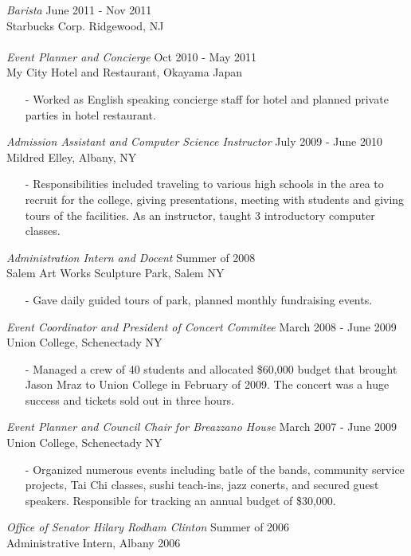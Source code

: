 \documentclass[margin, 10pt]{res} %
\begin{document}
\begin{resume}
{\sl Barista} \hfill June 2011 - Nov 2011 \\
Starbucks Corp. Ridgewood, NJ \\ \\
{\sl Event Planner and Concierge} \hfill Oct 2010 - May 2011 \\
My City Hotel and Restaurant, Okayama Japan
\begin{itemize} \itemsep -2pt
\item[-] Worked as English speaking concierge staff for hotel and planned private parties in hotel restaurant.
\end{itemize}

{\sl Admission Assistant and Computer Science Instructor} \hfill July 2009 - June 2010 \\
Mildred Elley, Albany, NY
\begin{itemize} \itemsep -2pt
\item[-] Responsibilities included traveling to various high schools in the area to recruit for the college, giving presentations, meeting with students and giving tours of the facilities.  As an instructor, taught 3 introductory computer classes.
\end{itemize}

{\sl Administration Intern and Docent} \hfill Summer of 2008 \\
Salem Art Works Sculpture Park, Salem NY
\begin{itemize} \itemsep -2pt
\item[-] Gave daily guided tours of park, planned monthly fundraising events. 
\end{itemize}

{\sl Event Coordinator and President of Concert Commitee} \hfill March 2008 - June 2009 \\
Union College, Schenectady NY
\begin{itemize} \itemsep -2pt
\item[-] Managed a crew of 40 students and allocated \$60,000 budget that brought Jason Mraz to Union College in February of 2009. The concert was a huge success and tickets sold out in three hours.
\end{itemize}

{\sl Event Planner and Council Chair for Breazzano House} \hfill March 2007 - June 2009 \\
Union College, Schenectady NY
\begin{itemize} \itemsep -2pt
\item[-] Organized numerous events including batle of the bands, community service projects, Tai Chi classes, sushi teach-ins, jazz conerts, and secured guest speakers.  Responsible for tracking an annual budget of \$30,000.
\end{itemize}

{\sl Office of Senator Hilary Rodham Clinton} \hfill Summer of 2006 \\
Administrative Intern, Albany 2006

\end{resume}
\end{document}
